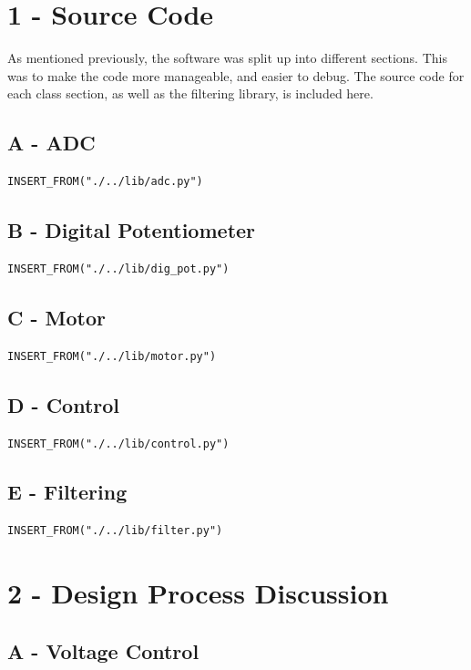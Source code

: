 \documentclass[twoside,a4]{report}
\begin{document}
\section{1 - Source Code} \label{apxsrc}
As mentioned previously, the software was split up into different sections. This was to make the code more manageable, and easier to debug. The source code for each class section, as well as the filtering library, is included here.
\subsection{A - ADC}
\begin{verbatim}
INSERT_FROM("./../lib/adc.py")
\end{verbatim}
\subsection{B - Digital Potentiometer}
\begin{verbatim}
INSERT_FROM("./../lib/dig_pot.py")
\end{verbatim}
\subsection{C - Motor}
\begin{verbatim}
INSERT_FROM("./../lib/motor.py")
\end{verbatim}
\subsection{D - Control}
\begin{verbatim}
INSERT_FROM("./../lib/control.py")
\end{verbatim}
\subsection{E - Filtering}
\begin{verbatim}
INSERT_FROM("./../lib/filter.py")
\end{verbatim}
\section{2 - Design Process Discussion}
\subsection{A - Voltage Control}
\end{document}
